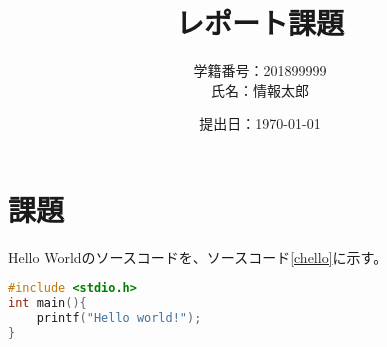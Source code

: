 \documentclass[a4j]{ltjsarticle}
\title{レポート課題}
\author{学籍番号：201899999\\氏名：情報太郎}
\date{提出日：\today}
\begin{document}
\maketitle

\section{課題}

Hello Worldのソースコードを、ソースコード\ref{chello}に示す。

\begin{lstlisting}[language=c,caption=C言語でHello World,label=chello]
#include <stdio.h>
int main(){
    printf("Hello world!");
}
\end{lstlisting}
\end{document}
